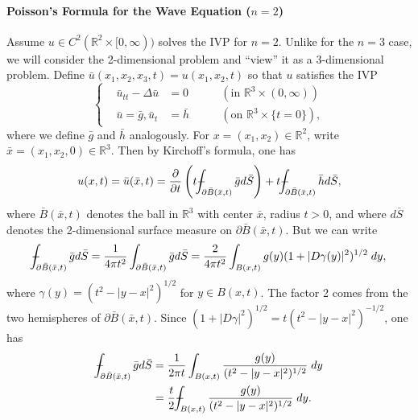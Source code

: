 \documentclass{article}
\def\Xint#1{\mathchoice
	{\XXint\displaystyle\textstyle{#1}}%
	{\XXint\textstyle\scriptstyle{#1}}%
	{\XXint\scriptstyle\scriptscriptstyle{#1}}%
	{\XXint\scriptscriptstyle\scriptscriptstyle{#1}}%
	\!\int}
\def\XXint#1#2#3{{\setbox0=\hbox{$#1{#2#3}{\int}$ }
		\vcenter{\hbox{$#2#3$ }}\kern-0.6\wd0}}
\def\dashint{\Xint-}
\numberwithin{equation}{section}
\begin{document}
	\paragraph{Poisson's Formula for the Wave Equation \texorpdfstring{($n = 2$)}{n=2}} Assume $u \in C^{2}(\mathbb{R}^{2} \times [0,\infty))$ solves the IVP for $n = 2$. Unlike for the $n = 3$ case, we will consider the 2-dimensional problem and ``view'' it as a 3-dimensional problem. Define $\bar{u}(x_{1}, x_{2}, x_{3}, t) = u(x_{1}, x_{2}, t)$ so that $u$ satisfies the IVP 
	\begin{equation*}
		\left\{
		\begin{alignedat}{3}
			&\bar{u}_{tt} - \Delta \bar{u} &= 0 &\qquad(\text{in $\mathbb{R}^{3} \times (0, \infty)$}) \\
			&\bar{u} =\bar{g}, \bar{u}_{t} &= \bar{h} &\qquad(\text{on $\mathbb{R}^{3} \times \{t = 0\}$}), 
		\end{alignedat}
		\right.
	\end{equation*}
	where we define $\bar{g}$ and $\bar{h}$ analogously. For $x = (x_{1}, x_{2}) \in \mathbb{R}^{2}$, write $\bar{x} = (x_{1}, x_{2}, 0) \in \mathbb{R}^{3}$. Then by Kirchoff's formula, one has 
	\begin{equation*}
		u(x, t) = \bar{u}(\bar{x}, t) = \frac{\partial}{\partial t}\left(t\dashint_{\partial \bar{B}(\bar{x},t)}\bar{g}d\bar{S}\right) + t\dashint_{\partial \bar{B}(\bar{x},t)}\bar{h}d\bar{S}, 
	\end{equation*}
	where $\bar{B}(\bar{x}, t)$ denotes the ball in $\mathbb{R}^{3}$ with center $\bar{x}$, radius $t > 0$, and where $d\bar{S}$ denotes the 2-dimensional surface measure on $\partial \bar{B}(\bar{x}, t)$. But we can write 
	\begin{equation*}
		\dashint_{\partial \bar{B}(\bar{x},t)}\bar{g}d\bar{S} = \frac{1}{4\pi t^{2}}\int_{\partial \bar{B}(\bar{x}, t)}\bar{g}d\bar{S} = \frac{2}{4\pi t^{2}}\int_{B(x,t)}g(y)(1 + |D\gamma(y)|^{2})^{1/2}\;dy, 
	\end{equation*}
	where $\gamma(y) = (t^{2} - |y - x|^{2})^{1/2}$ for $y \in B(x, t)$. The factor 2 comes from the two hemispheres of $\partial\bar{B}(\bar{x}, t)$. Since $(1 + |D\gamma|^{2})^{1/2} = t(t^{2} - |y - x|^{2})^{-1/2}$, one has 
	\begin{align*}
		\begin{split}
			\dashint_{\partial \bar{B}(\bar{x}, t)}\bar{g}d\bar{S} &= \frac{1}{2\pi t}\int_{B(x,t)}\frac{g(y)}{(t^{2} - |y - x|^{2})^{1/2}}\;dy \\
			&= \frac{t}{2}\dashint_{B(x,t)}\frac{g(y)}{(t^{2} - |y - x|^{2})^{1/2}}\;dy.
		\end{split}
	\end{align*}
\end{document}
